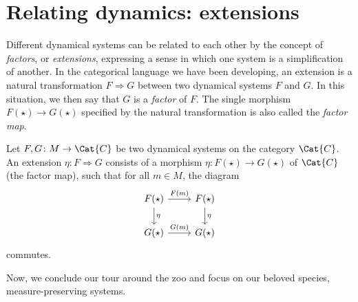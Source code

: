 \documentclass[../main]{subfiles}
\begin{document}



\section{Relating dynamics: extensions}

Different dynamical systems can be related to each other by the concept of \emph{factors}, or \emph{extensions}, expressing a sense in which one system is a simplification of another. In the categorical language we have been developing, an extension is a natural transformation \(F \Rightarrow G\) between two dynamical systems \(F\) and \(G\). In this situation, we then say that \(G\) is a \emph{factor} of \(F\). The single morphism \(F(\star) \to G(\star)\) specified by the natural transformation is also called the \emph{factor map}.

\begin{definition}
  Let \(F,G \colon M \to \Cat{C}\) be two dynamical systems on the category \(\Cat{C}\). An extension \(\eta \colon F \Rightarrow G\) consists of a morphism \(\eta \colon F(\star) \to G(\star)\) of \(\Cat{C}\) (the factor map), such that for all \(m \in M\), the diagram
  \begin{equation*}
    \begin{tikzcd}
      F(\star) \arrow[r, "F(m)"] \arrow[d, "\eta"] & F(\star) \arrow[d, "\eta"] \\
      G(\star) \arrow[r, "G(m)"] & G(\star)
    \end{tikzcd}
  \end{equation*}
  commutes.
\end{definition}

Now, we conclude our tour around the zoo and focus on our beloved species, measure-preserving systems.
\end{document}
